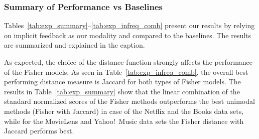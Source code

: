 \subsubsection{Summary of Performance vs Baselines} 
Tables~\ref{tab:exp_summary}--\ref{tab:exp_infreq_comb} present our results by relying on implicit feedback as our modality and compared to the baselines. The results are summarized and explained in the caption.

As expected, the choice of the distance function strongly affects the performance of the Fisher models. As seen in Table~\ref{tab:exp_infreq_comb}, the overall best performing distance measure is Jaccard for both types of Fisher models. 
The results in Table~\ref{tab:exp_summary} show that the linear combination of the standard normalized scores of the Fisher methods outperforms the best unimodal methods (Fisher with Jaccard) in case of the Netflix and the Books data sets, while for the MovieLens and Yahoo!\ Music data sets the Fisher distance with Jaccard performs best. 

